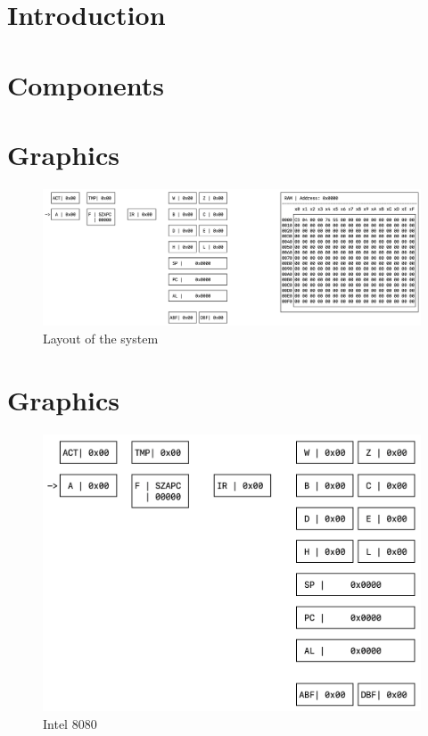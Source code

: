 \documentclass[12pt]{article}
\begin{document}
\sloppy



% 
% 

\newpage

\section{Introduction}


\section{Components}


\section{Graphics}

\begin{figure}
    \centering
    \includegraphics[scale=0.45]{layout.png}
    \caption{Layout of the system}
    \label{fig:layout}
\end{figure}
\section{Graphics}

\begin{figure}
    \centering
    \includegraphics[scale=0.9]{intel8080.png}
    \caption{Intel 8080}
    \label{fig:intel8080}
\end{figure}
\end{document}
